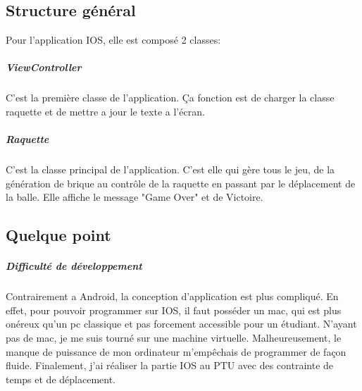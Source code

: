 \documentclass[a4paper]{article}
\begin{document}
\subsection{Structure général}
Pour l'application IOS, elle est composé 2 classes:
\subparagraph{ViewController}C'est la première classe de l'application. Ça fonction est de charger la classe raquette et de mettre a jour le texte a l'écran.
\subparagraph{Raquette} C'est la classe principal de l'application. C'est elle qui gère tous le jeu, de la génération de brique au contrôle de la raquette en passant par le déplacement de la balle. Elle affiche le message "Game Over" et de Victoire.
\subsection{Quelque point}
\subparagraph{Difficulté de développement}
Contrairement a Android, la conception d'application est plus compliqué. En effet, pour pouvoir programmer sur IOS, il faut posséder un mac, qui est plus onéreux qu'un pc classique et pas forcement accessible pour un étudiant. N'ayant pas de mac, je me suis tourné sur une machine virtuelle. Malheureusement, le manque de puissance de mon ordinateur m’empêchais de programmer de façon fluide. Finalement, j'ai réaliser la partie IOS au PTU avec des contrainte de temps et de déplacement.
\end{document}
